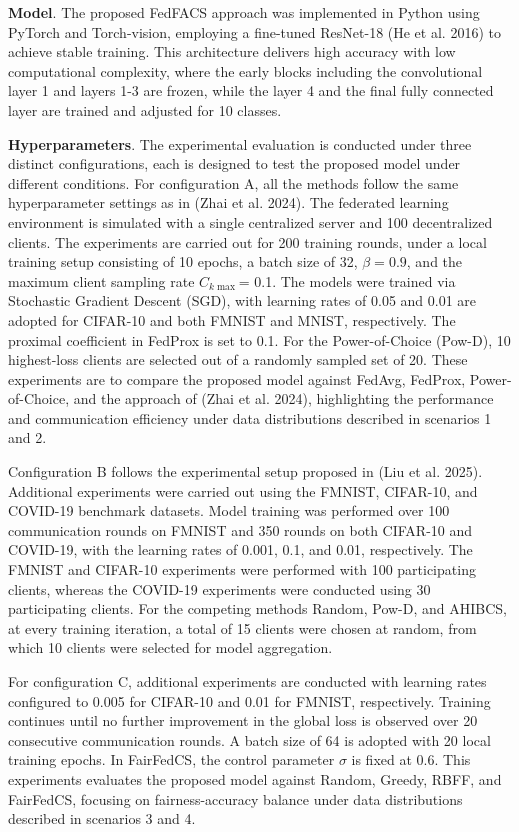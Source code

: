 \documentclass[pdflatex,sn-mathphys-num,oneside]{sn-jnl}%
\theoremstyle{thmstyleone}%
\theoremstyle{thmstyletwo}%
\theoremstyle{thmstylethree}%
\begin{document}
\textbf{Model}. The proposed FedFACS approach was implemented in Python using PyTorch and Torch-vision, employing a fine-tuned ResNet-18 (He et al. 2016) to achieve stable training. This architecture delivers high accuracy with low computational complexity, where the early blocks including the convolutional layer 1 and layers 1-3 are frozen, while the layer 4 and the final fully connected layer are trained and adjusted for 10 classes.

\textbf{Hyperparameters}. The experimental evaluation is conducted under three distinct configurations, each is designed to test the proposed model under different conditions. For configuration A, all the methods follow the same hyperparameter settings as in (Zhai et al. 2024). The federated learning environment is simulated with a single centralized server and 100 decentralized clients. The experiments are carried out for 200 training rounds, under a local training setup consisting of 10 epochs, a batch size of 32, $\beta = 0.9$, and the maximum client sampling rate $C_{k\max}$= 0.1. The models were trained via Stochastic Gradient Descent (SGD), with learning rates of 0.05 and 0.01 are adopted for CIFAR-10 and both FMNIST and MNIST, respectively. The proximal coefficient in FedProx is set to 0.1. For the Power-of-Choice (Pow-D), 10 highest-loss clients are selected out of a randomly sampled set of 20. These experiments are to compare the proposed model against FedAvg, FedProx, Power-of-Choice, and the approach of (Zhai et al. 2024), highlighting the performance and communication efficiency under data distributions described in scenarios 1 and 2.

Configuration B follows the experimental setup proposed in (Liu et al. 2025). Additional experiments were carried out using the FMNIST, CIFAR-10, and COVID-19 benchmark datasets. Model training was performed over 100 communication rounds on FMNIST and 350 rounds on both CIFAR-10 and COVID-19, with the learning rates of 0.001, 0.1, and 0.01, respectively. The FMNIST and CIFAR-10 experiments were performed with 100 participating clients, whereas the COVID-19 experiments were conducted using 30 participating clients. For the competing methods Random, Pow-D, and AHIBCS, at every training iteration, a total of 15 clients were chosen at random, from which 10 clients were selected for model aggregation.

For configuration C, additional experiments are conducted with learning rates configured to 0.005 for CIFAR-10 and 0.01 for FMNIST, respectively. Training continues until no further improvement in the global loss is observed over 20 consecutive communication rounds. A batch size of 64 is adopted with 20 local training epochs. In FairFedCS, the control parameter $\sigma$ is fixed at 0.6. This experiments evaluates the proposed model against Random, Greedy, RBFF, and FairFedCS, focusing on fairness-accuracy balance under data distributions described in scenarios 3 and 4.
\end{document}
